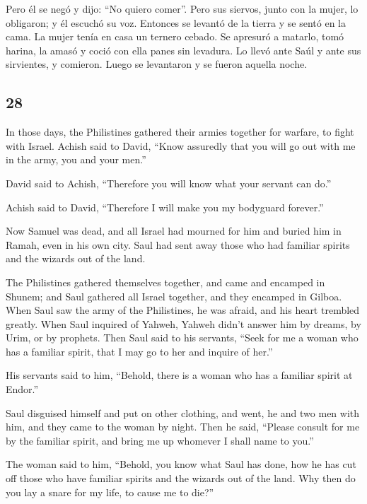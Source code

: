 \begin{paracol}{2}
 Pero él se negó y dijo: ``No quiero comer''. Pero sus
siervos, junto con la mujer, lo obligaron; y él escuchó su voz. Entonces
se levantó de la tierra y se sentó en la cama.  La mujer
tenía en casa un ternero cebado. Se apresuró a matarlo, tomó harina, la
amasó y coció con ella panes sin levadura.  Lo llevó ante
Saúl y ante sus sirvientes, y comieron. Luego se levantaron y se fueron
aquella noche.

\switchcolumn
\begin{otherlanguage}{english}

\hypertarget{section-55}{%
\section{28}\label{section-55}}

 In those days, the Philistines gathered their armies
together for warfare, to fight with Israel. Achish said to David, ``Know
assuredly that you will go out with me in the army, you and your men.''

 David said to Achish, ``Therefore you will know what your
servant can do.''

Achish said to David, ``Therefore I will make you my bodyguard
forever.''

 Now Samuel was dead, and all Israel had mourned for him
and buried him in Ramah, even in his own city. Saul had sent away those
who had familiar spirits and the wizards out of the land.

 The Philistines gathered themselves together, and came
and encamped in Shunem; and Saul gathered all Israel together, and they
encamped in Gilboa.  When Saul saw the army of the
Philistines, he was afraid, and his heart trembled greatly.
 When Saul inquired of Yahweh, Yahweh didn't answer him by
dreams, by Urim, or by prophets.  Then Saul said to his
servants, ``Seek for me a woman who has a familiar spirit, that I may go
to her and inquire of her.''

His servants said to him, ``Behold, there is a woman who has a familiar
spirit at Endor.''

 Saul disguised himself and put on other clothing, and
went, he and two men with him, and they came to the woman by night. Then
he said, ``Please consult for me by the familiar spirit, and bring me up
whomever I shall name to you.''

 The woman said to him, ``Behold, you know what Saul has
done, how he has cut off those who have familiar spirits and the wizards
out of the land. Why then do you lay a snare for my life, to cause me to
die?''


\end{otherlanguage}
\end{paracol}
